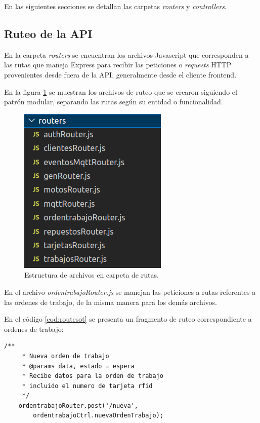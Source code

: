 En las siguientes secciones se detallan las carpetas \textit{routers} y \textit{controllers}.

\subsection{Ruteo de la API}
\label{subsec:apirouters}

En la carpeta \textit{routers} se encuentran los archivos Javascript que corresponden a las rutas que maneja Express para recibir las peticiones o \textit{requests} HTTP provenientes desde fuera de la API, generalmente desde el cliente frontend.

En la figura \ref{fig:apiroutes} se muestran los archivos de ruteo que se crearon siguiendo el patrón modular, separando las rutas según su entidad o funcionalidad.

\begin{figure}[ht]
	\centering
	\includegraphics[scale=.50]{./Figures/api-routes.png}
	\caption{Estructura de archivos en carpeta de rutas.}
	\label{fig:apiroutes}
\end{figure}

En el archivo \textit{ordentrabajoRouter.js} se manejan las peticiones a rutas referentes a las ordenes de trabajo, de la misma manera para los demás archivos. 

En el código \ref{cod:routesot} se presenta un fragmento de ruteo correspondiente a ordenes de trabajo:


\begin{lstlisting}[label=cod:routesot,caption=Código de ruteo para ordenes de trabajo.]
    /**
     * Nueva orden de trabajo
     * @params data, estado = espera
     * Recibe datos para la orden de trabajo
     * incluido el numero de tarjeta rfid
     */
    ordentrabajoRouter.post('/nueva',
        ordentrabajoCtrl.nuevaOrdenTrabajo);
\end{lstlisting}

